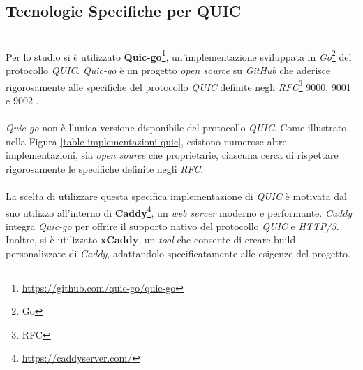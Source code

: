 \subsection{Tecnologie Specifiche per QUIC}
~\\
\indent Per lo studio si è utilizzato \textbf{Quic-go}\footnote{\url{https://github.com/quic-go/quic-go}}, un'implementazione sviluppata in \emph{Go}\footnote{\gls{Go}} del protocollo \emph{QUIC}.
\emph{Quic-go} è un progetto \emph{open source} su \emph{GitHub} che aderisce rigorosamente alle specifiche del protocollo \emph{QUIC} 
definite negli \emph{RFC}\footnote{\gls{RFC}} 9000, 9001 e 9002 \cite{site:rfc9000,site:rfc9001,site:rfc9002}. 
\\\\
\emph{Quic-go} non è l'unica versione disponibile del protocollo \emph{QUIC}.
Come illustrato nella Figura \ref{table-implementazioni-quic}, esistono numerose altre implementazioni, sia \emph{open source} che proprietarie, ciascuna cerca di rispettare rigorosamente le specifiche definite negli \emph{RFC}. 
\\\\
La scelta di utilizzare questa specifica implementazione di \emph{QUIC} è motivata dal suo utilizzo all'interno di \textbf{Caddy}\footnote{\url{https://caddyserver.com/}}, un \emph{web server} moderno e performante. \emph{Caddy} integra \emph{Quic-go} per offrire il supporto nativo del protocollo \emph{QUIC} e \emph{HTTP/3}.
Inoltre, si è utilizzato \textbf{xCaddy}, un \emph{tool} che consente di creare build personalizzate di \emph{Caddy}, adattandolo specificatamente alle esigenze del progetto.

